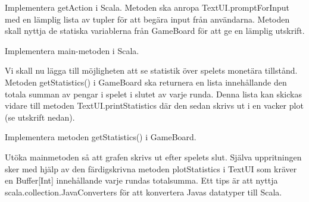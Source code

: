 \Subtask Implementera getAction i Scala. Metoden ska anropa TextUI.promptForInput med en lämplig lista av tupler för att begära input från användarna. Metoden skall nyttja de statiska variablerna från GameBoard för att ge en lämplig utskrift.

\Subtask Implementera main-metoden i Scala.

\Task Vi skall nu lägga till möjligheten att se statistik över spelets monetära tillstånd. Metoden getStatistics() i GameBoard  ska returnera en lista innehållande den totala summan av pengar i spelet i slutet av varje runda. Denna lista kan skickas vidare till metoden TextUI.printStatistics där den sedan skrivs ut i en vacker plot (se utskrift nedan).

\Subtask Implementera metoden getStatistics() i GameBoard.

\Subtask Utöka mainmetoden så att grafen skrivs ut efter spelets slut. 
Själva uppritningen sker med hjälp av den färdigskrivna metoden plotStatistics i TextUI som kräver en Buffer[Int] innehållande varje rundas totalsumma. 
Ett tips är att nyttja scala.collection.JavaConverters för att konvertera Javas datatyper till Scala.


